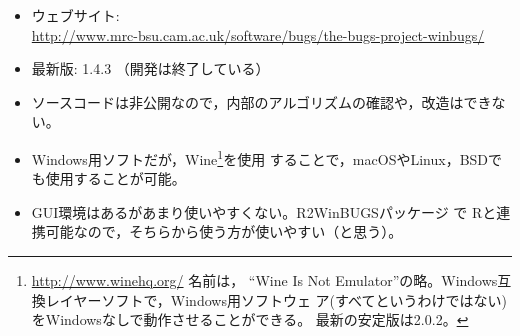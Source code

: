 \documentclass[11pt,uplatex]{jsarticle}
\begin{document}
\begin{itemize}
\item ウェブサイト:\\
  \url{http://www.mrc-bsu.cam.ac.uk/software/bugs/the-bugs-project-winbugs/}
\item 最新版: 1.4.3 （開発は終了している）
\item ソースコードは非公開なので，内部のアルゴリズムの確認や，改造はできない。
\item Windows用ソフトだが，\textsf{Wine}\footnote{\url{http://www.winehq.org/} 名前は，
``Wine Is Not Emulator''の略。Windows互換レイヤーソフトで，Windows用ソフトウェ
  ア(すべてというわけではない)をWindowsなしで動作させることができる。
  最新の安定版は2.0.2。}を使用
  することで，macOSやLinux，BSDでも使用することが可能。
\item GUI環境はあるがあまり使いやすくない。\textsf{R2WinBUGS}パッケージ
  で \textsf{R}と連携可能なので，そちらから使う方が使いやすい（と思う）。
\end{itemize}
\end{document}
